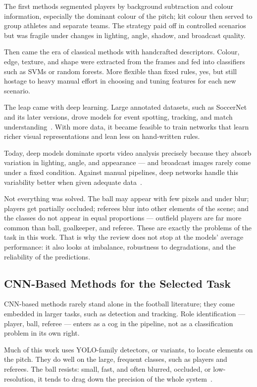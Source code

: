 \documentclass[preprint,12pt]{elsarticle}
\begin{document}
The first methods segmented players by background subtraction and colour information, especially the dominant colour of the pitch; kit colour then served to group athletes and separate teams. The strategy paid off in controlled scenarios but was fragile under changes in lighting, angle, shadow, and broadcast quality.

Then came the era of classical methods with handcrafted descriptors. Colour, edge, texture, and shape were extracted from the frames and fed into classifiers such as SVMs or random forests. More flexible than fixed rules, yes, but still hostage to heavy manual effort in choosing and tuning features for each new scenario.

The leap came with deep learning. Large annotated datasets, such as SoccerNet and its later versions, drove models for event spotting, tracking, and match understanding~\cite{giancola2018soccernet,deliege2021soccernetv2}. With more data, it became feasible to train networks that learn richer visual representations and lean less on hand-written rules.

Today, deep models dominate sports video analysis precisely because they absorb variation in lighting, angle, and appearance --- and broadcast images rarely come under a fixed condition. Against manual pipelines, deep networks handle this variability better when given adequate data~\cite{liang2025basketball}.

Not everything was solved. The ball may appear with few pixels and under blur; players get partially occluded; referees blur into other elements of the scene; and the classes do not appear in equal proportions --- outfield players are far more common than ball, goalkeeper, and referee. These are exactly the problems of the task in this work. That is why the review does not stop at the models' average performance: it also looks at imbalance, robustness to degradations, and the reliability of the predictions.

\subsection{CNN-Based Methods for the Selected Task}

CNN-based methods rarely stand alone in the football literature; they come embedded in larger tasks, such as detection and tracking. Role identification --- player, ball, referee --- enters as a cog in the pipeline, not as a classification problem in its own right.

Much of this work uses YOLO-family detectors, or variants, to locate elements on the pitch. They do well on the large, frequent classes, such as players and referees. The ball resists: small, fast, and often blurred, occluded, or low-resolution, it tends to drag down the precision of the whole system~\cite{liang2025basketball,giancola2018soccernet}.
\end{document}
